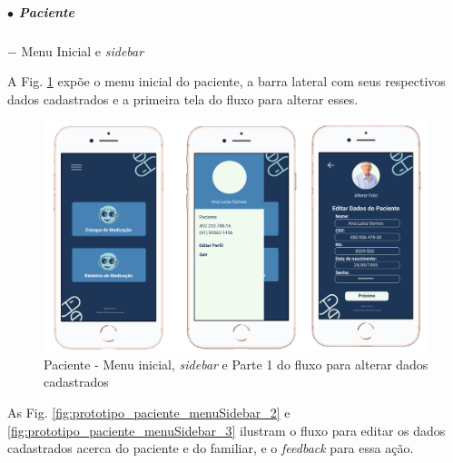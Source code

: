 \subparagraph*{$\bullet$ Paciente} \hfill
\subparagraph*{} $-$ Menu Inicial e \textit{sidebar}

A Fig. \ref{fig:prototipo_paciente_menuSidebar_1} expõe o menu inicial do paciente, a barra lateral com seus respectivos dados cadastrados e a primeira tela do fluxo para alterar esses.

\begin{figure}[H]
    \centering
    \includegraphics[width=15cm]{figuras/software/Atual_prototipo/Paciente_menuSidebar_1.png}
    \caption{Paciente - Menu inicial, \textit{sidebar} e Parte 1 do fluxo para alterar dados cadastrados}
    \label{fig:prototipo_paciente_menuSidebar_1}
\end{figure}

As Fig. \ref{fig:prototipo_paciente_menuSidebar_2} e \ref{fig:prototipo_paciente_menuSidebar_3} ilustram o fluxo para editar os dados cadastrados acerca do paciente e do familiar, e o \textit{feedback} para essa ação.

